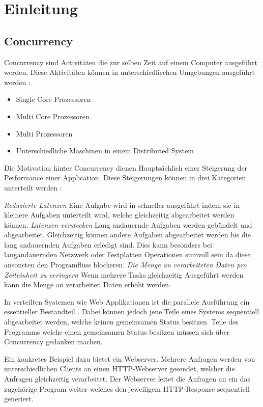 \section{Einleitung}
\label{section:Einleitung}

\subsection{Concurrency}
\label{section:concurrency}


Concurrency sind Activitäten die zur selben Zeit auf einem Computer ausgeführt werden. Diese Aktivitäten können in unterschiedliechen Umgebungen ausgeführt werden \cite[p. 14]{Erb2012}:

\begin{itemize}
  \item Single Core Prozessoren
  \item Multi Core Prozessoren
  \item Multi Prozessoren
  \item Unterschiedliche Maschinen in einem Distributed System
\end{itemize}

Die Motivation hinter Concurrency dienen Hauptsächlich einer Steigerung der Performance einer Application. Diese Steigerungen können in drei Kategorien unterteilt werden \cite[p. 18]{Can08}: 

\emph{Reduzierte Latenzen}
	Eine Aufgabe wird in schneller ausgeführt indem sie in kleinere Aufgaben unterteilt wird, welche gleichzeitig abgearbeitet werden können. \cite[p. 18]{Can08}
\emph{Latenzen verstecken}
	Lang andauernde Aufgaben werden gebündelt und abgearbeitet. Gleichzeitig können andere Aufgaben abgearbeitet werden bis die lang andauernden Aufgaben erledigt sind. Dies kann besonders bei langandauernden Netzwerk oder Festplatten Operationen sinnvoll sein da diese ansonsten den Programfluss blockeren.
\emph{Die Menge an verarbeiteten Daten pro Zeiteinheit zu veringern}
	Wenn mehrere Tasks gleichzeitig Ausgeführt werden kann die Menge an verarbeiten Daten erhöht werden.	

In verteilten Systemen wie Web Applikationen ist die parallele Ausführung ein essentieller Bestandteil \cite[p. 14]{Erb2012}. Dabei können jedoch jene Teile eines Systems sequentiell abgearbeitet werden, welche keinen gemeinsamen Status besitzen. Teile des Programms welche einen gemeinsamen Status besitzen müssen sich über Concurrency gedanken machen. \cite[p. 18]{Can08}

Ein konkretes Beispiel dazu bietet ein Webserver. Mehrere Anfragen werden von unterschiedlichen Clients an einen HTTP-Webserver gesendet, welcher die Anfragen gleichzeitig verarbeitet. Der Webserver leitet die Anfragen an ein das zugehörige Program weiter welches den jeweiligem HTTP-Response sequentiell generiert. \cite[p. 18]{Can08}


